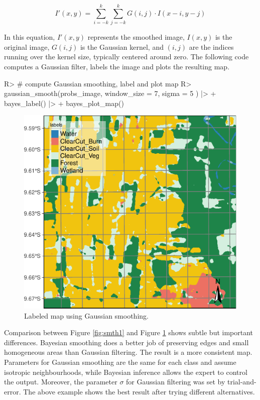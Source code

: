 \documentclass[
  shortnames]{jss}
\begin{document}
\begin{equation}
   I'(x, y) = \sum_{i=-k}^{k} \sum_{j=-k}^{k} G(i, j) \cdot I(x - i, y - j)
\end{equation}

In this equation, \(I'(x, y)\) represents the smoothed image, \(I(x, y)\) is the original image, \(G(i, j)\) is the Gaussian kernel, and \((i,j)\) are the indices running over the kernel size, typically centered around zero. The following code computes a Gaussian filter, labels the image and plots the resulting map.

\begin{CodeChunk}
\begin{CodeInput}
R> # compute Gaussian smoothing, label and plot map
R> gaussian_smooth(probs_image, window_size = 7, sigma = 5 ) |> 
+   bayes_label() |> 
+   bayes_plot_map()
\end{CodeInput}
\begin{figure}[h]

{\centering \includegraphics{Bayesian_smoothing_JSS_files/figure-latex/gauss-1} 

}

\caption[Labeled map using Gaussian smoothing]{Labeled map using Gaussian smoothing.}\label{fig:gauss}
\end{figure}
\end{CodeChunk}

Comparison between Figure \ref{fig:smth1} and Figure \ref{fig:gauss} shows subtle but important differences. Bayesian smoothing does a better job of preserving edges and small homogeneous areas than Gaussian filtering. The result is a more consistent map. Parameters for Gaussian smoothing are the same for each class and assume isotropic neighbourhoods, while Bayesian inference allows the expert to control the output. Moreover, the parameter \(\sigma\) for Gaussian filtering was set by trial-and-error. The above example shows the best result after trying different alternatives.
\end{document}
